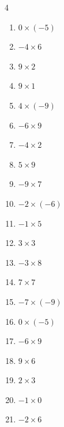 \begin{multicols}{4}
\begin{enumerate}
  \item $0\times (-5)$
        \phantom{$=0$}

  \item $-4\times 6$
        \phantom{$=-24$}

  \item $9\times 2$
        \phantom{$=18$}

  \item $9\times 1$
        \phantom{$=9$}

  \item $4\times (-9)$
        \phantom{$=-36$}

  \item $-6\times 9$
        \phantom{$=-54$}

  \item $-4\times 2$
        \phantom{$=-8$}

\columnbreak %

  \item $5\times 9$
        \phantom{$=45$}

  \item $-9\times 7$
        \phantom{$=-63$}

  \item $-2\times (-6)$
        \phantom{$=12$}

  \item $-1\times 5$
        \phantom{$=-5$}

  \item $3\times 3$
        \phantom{$=9$}

  \item $-3\times 8$
        \phantom{$=-24$}

  \item $7\times 7$
        \phantom{$=49$}

  \item $-7\times (-9)$
        \phantom{$=63$}

  \item $0\times (-5)$
        \phantom{$=0$}

  \item $-6\times 9$
        \phantom{$=-54$}

  \item $9\times 6$
        \phantom{$=54$}

  \item $2\times 3$
        \phantom{$=6$}

  \item $-1\times 0$
        \phantom{$=0$}

  \item $-2\times 6$
        \phantom{$=-12$}


\end{enumerate}
\end{multicols}
